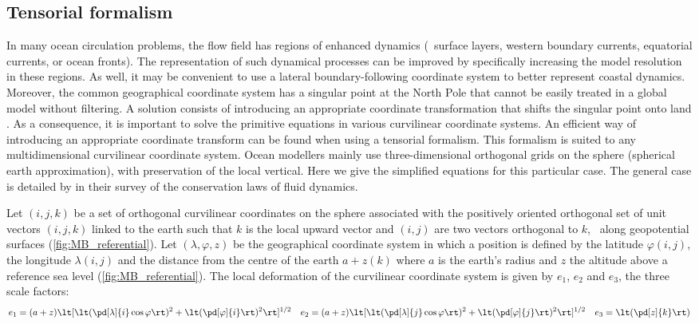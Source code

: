 \documentclass[../main/NEMO_manual]{subfiles}
\begin{document}
\subsection{Tensorial formalism}
\label{subsec:MB_tensorial}

In many ocean circulation problems, the flow field has regions of enhanced dynamics
(\ie\ surface layers, western boundary currents, equatorial currents, or ocean fronts).
The representation of such dynamical processes can be improved by
specifically increasing the model resolution in these regions.
As well, it may be convenient to use a lateral boundary-following coordinate system to
better represent coastal dynamics.
Moreover, the common geographical coordinate system has a singular point at the North Pole that
cannot be easily treated in a global model without filtering.
A solution consists of introducing an appropriate coordinate transformation that
shifts the singular point onto land \citep{madec.imbard_CD96, murray_JCP96}.
As a consequence,
it is important to solve the primitive equations in various curvilinear coordinate systems.
An efficient way of introducing an appropriate coordinate transform can be found when
using a tensorial formalism.
This formalism is suited to any multidimensional curvilinear coordinate system.
Ocean modellers mainly use three-dimensional orthogonal grids on the sphere
(spherical earth approximation), with preservation of the local vertical.
Here we give the simplified equations for this particular case.
The general case is detailed by \citet{eiseman.stone_SR80} in
their survey of the conservation laws of fluid dynamics.

Let $(i,j,k)$ be a set of orthogonal curvilinear coordinates on
the sphere associated with the positively oriented orthogonal set of unit vectors
$(i,j,k)$ linked to the earth such that
$k$ is the local upward vector and $(i,j)$ are two vectors orthogonal to $k$,
\ie\ along geopotential surfaces (\autoref{fig:MB_referential}).
Let $(\lambda,\varphi,z)$ be the geographical coordinate system in which a position is defined by
the latitude $\varphi(i,j)$, the longitude $\lambda(i,j)$ and
the distance from the centre of the earth $a + z(k)$ where $a$ is the earth's radius and
$z$ the altitude above a reference sea level (\autoref{fig:MB_referential}).
The local deformation of the curvilinear coordinate system is given by $e_1$, $e_2$ and $e_3$,
the three scale factors:
\begin{equation}
  \label{eq:MB_scale_factors}
    e_1 = (a + z) \lt[ \lt( \pd[\lambda]{i} \cos \varphi \rt)^2 + \lt( \pd[\varphi]{i} \rt)^2 \rt]^{1/2} \quad e_2 = (a + z) \lt[ \lt( \pd[\lambda]{j} \cos \varphi \rt)^2 + \lt( \pd[\varphi]{j} \rt)^2 \rt]^{1/2} \quad e_3 = \lt( \pd[z]{k} \rt)
\end{equation}
\end{document}

